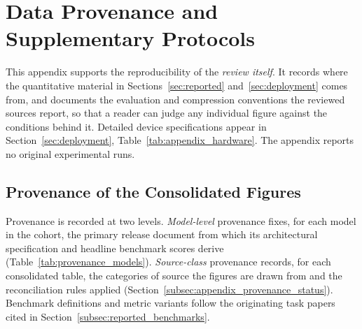 \section{Data Provenance and Supplementary Protocols}
\label{appendix:supplementary}
\label{app:provenance}

This appendix supports the reproducibility of the \emph{review itself}. It records where the quantitative material in Sections~\ref{sec:reported} and~\ref{sec:deployment} comes from, and documents the evaluation and compression conventions the reviewed sources report, so that a reader can judge any individual figure against the conditions behind it. Detailed device specifications appear in Section~\ref{sec:deployment}, Table~\ref{tab:appendix_hardware}. The appendix reports no original experimental runs.

\subsection{Provenance of the Consolidated Figures}
\label{subsec:appendix_provenance_table}


Provenance is recorded at two levels. \emph{Model-level} provenance fixes, for
each model in the cohort, the primary release document from which its
architectural specification and headline benchmark scores derive
(Table~\ref{tab:provenance_models}). \emph{Source-class} provenance records, for
each consolidated table, the categories of source the figures are drawn from and
the reconciliation rules applied
(Section~\ref{subsec:appendix_provenance_status}). Benchmark definitions and
metric variants follow the originating task papers cited in
Section~\ref{subsec:reported_benchmarks}.

